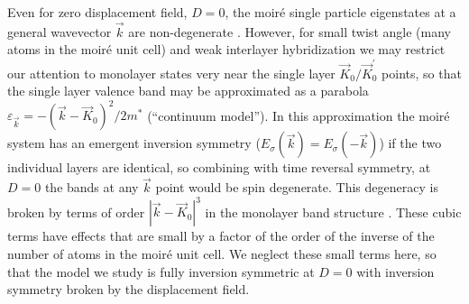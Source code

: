 \documentclass[%
reprint,
superscriptaddress,
twocolumn,
 amsmath,amssymb,
 aps,
 prb,
]{revtex4-2}
\begin{document}
Even for zero displacement field, $D=0$, the moir\'e single particle eigenstates at a general wavevector $\vec k$ are non-degenerate \cite{Senthil_TBG_Sym,2020arXiv201003589W}.  However, for small twist angle (many atoms in the moir\'e unit cell) and weak interlayer hybridization we may restrict our attention to monolayer states very near the single layer $\vec K_0 /\vec K_0 ^\prime$ points, so that the  single layer valence band may be approximated as a parabola $\varepsilon_{\vec k}=-(\vec{k}-\vec{K}_0)^2/2m^{\ast}$ (``continuum model''). In this approximation the moir\'e system has an emergent  inversion symmetry ($E_\sigma(\vec{k})=E_\sigma(-\vec{k})$) if the two individual layers are identical, so combining with time reversal symmetry, at $D=0$ the bands at any $\vec k$ point would be spin degenerate. This degeneracy is broken by terms of order $|\vec{k}-\vec{K}_0|^3$ in the monolayer band structure \cite{Korm_nyos_2015}. These cubic terms  have effects that are small by a factor of the order of the inverse of the number of atoms in the moir\'e unit cell. We neglect these small terms here, so that the model we study is fully inversion symmetric at $D=0$ with inversion symmetry broken by the displacement field. 
\end{document}
